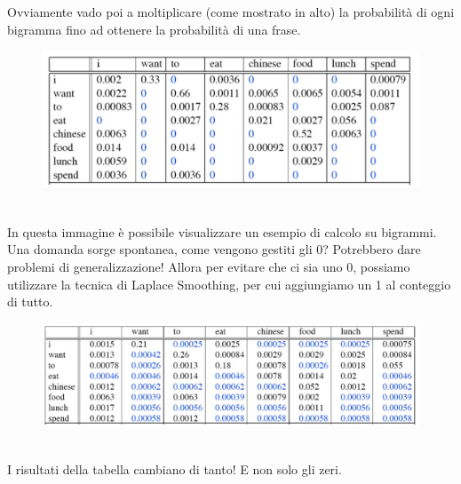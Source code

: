 Ovviamente vado poi a moltiplicare (come mostrato in alto) la probabilità di ogni bigramma fino ad ottenere la probabilità di una frase. 
\\
\begin{figure}[th]
    \centering
    \includegraphics[scale=0.45]{Text Analysis/img/bigrams.png}
\end{figure}
\\
In questa immagine è possibile visualizzare un esempio di calcolo su bigrammi. Una domanda sorge spontanea, come vengono gestiti gli 0? Potrebbero dare problemi di generalizzazione! Allora per evitare che ci sia uno 0, possiamo utilizzare la tecnica di Laplace Smoothing, per cui aggiungiamo un 1 al conteggio di tutto. 
\\
\begin{figure}[th]
    \centering
    \includegraphics[scale=0.45]{Text Analysis/img/laplacesmoothing.png}
\end{figure}
\\
I risultati della tabella cambiano di tanto! E non solo gli zeri.

\newpage

